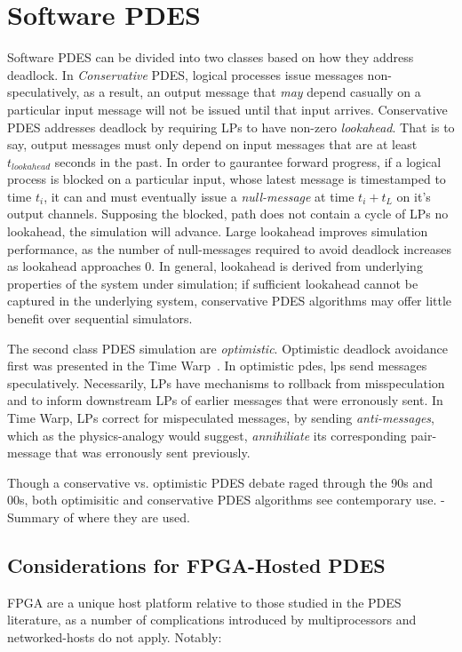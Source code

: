 \section{Software PDES}
Software PDES can be divided into two classes based on how they address
deadlock.  In \emph{Conservative} PDES, logical processes issue messages
non-speculatively, as a result, an output message that \emph{may} depend casually on a
particular input message will not be issued until that input arrives.
Conservative PDES addresses deadlock by requiring LPs to have non-zero
\emph{lookahead}. That is to say, output messages must only depend on input
messages that are at least  $t_{lookahead}$ seconds in the past. In order to gaurantee forward
progress, if a logical process is blocked on a particular input, whose latest
message is timestamped to time $t_{i}$, it can and must eventually issue a
\emph{null-message} at time $t_{i} + t_{L}$ on it's output channels. Supposing
the blocked, path does not contain a cycle of LPs no lookahead, the simulation
will advance.  Large lookahead improves simulation performance, as the number
of null-messages required to avoid deadlock increases as lookahead approaches 0.
In general, lookahead is derived from underlying properties of the system under simulation;
if sufficient lookahead cannot be captured in the underlying system, conservative PDES algorithms may
offer little benefit over sequential simulators.

The second class PDES simulation are \emph{optimistic}. Optimistic deadlock
avoidance first was presented in the Time Warp~\cite{TimeWarp}. In optimistic
pdes, lps send messages speculatively. Necessarily, LPs have mechanisms to
rollback from misspeculation and to inform downstream LPs of earlier messages
that were erronously sent. In Time Warp, LPs correct for mispeculated messages,
by sending \emph{anti-messages}, which as the physics-analogy would suggest,
\emph{annihiliate} its corresponding pair-message that was erronously sent previously.

Though a conservative vs. optimistic PDES debate raged through
the 90s and 00s, both optimisitic and conservative PDES algorithms see
contemporary use.
- Summary of where they are used.

\subsection{Considerations for FPGA-Hosted PDES}

FPGA are a unique host platform relative to those studied in the PDES
literature, as a number of complications introduced by multiprocessors and
networked-hosts do not apply. Notably:

